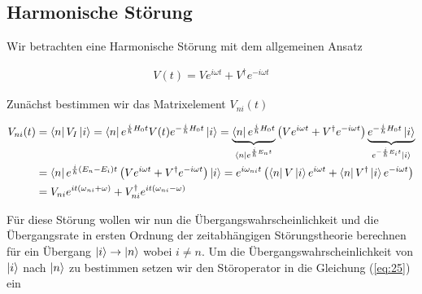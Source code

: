 \subsection{Harmonische Störung}

Wir betrachten eine Harmonische Störung mit dem allgemeinen Ansatz

\begin{align}
  \label{eq:41}
  V(t) = Ve^{i\omega t} + V^\dagger e^{-i\omega t}
\end{align}

Zunächst bestimmen wir das Matrixelement \(V_{ni}(t)\)

\begin{align}
  \label{eq:43}
   V_{ni}(t) &= \bra{n} V_I \ket{i} = \bra{n}e^{\frac{i}{\hbar}H_0 t}V(t) e^{ -\frac{i}{\hbar}H_0 t } \ket{i} = \underbr{\bra{n}e^{\frac{i}{\hbar}H_0 t}}_{\bra{n}e^{\frac{i}{\hbar}E_n t}} \left(Ve^{i\omega t} + V^\dagger e^{-i\omega t}\right) \underbr{ e^{ -\frac{i}{\hbar}H_0 t } \ket{i}}_{e^{ -\frac{i}{\hbar}E_i t } \ket{i}} \notag \\
 & = \bra{n}e^{\frac{i}{\hbar}(E_n-E_i) t} \left(Ve^{i\omega t} + V^\dagger e^{-i\omega t}\right) \ket{i} =  e^{i\omega_{ni} t} \left(\bra{n}V\ket{i} e^{i\omega t} +\bra{n} V^\dagger\ket{i} e^{-i\omega t}\right) \notag \\
 &=  V_{ni} e^{it(\omega_{ni}+\omega) }+ V^\dagger_{ni} e^{it(\omega_{ni}-\omega) }
\end{align}

Für diese Störung wollen wir nun die Übergangswahrscheinlichkeit und die Übergangsrate in ersten Ordnung der zeitabhängigen Störungstheorie berechnen für ein Übergang \(\left| i \right\rangle\to\left| n \right\rangle\) wobei \(i\ne n\). Um die Übergangswahrscheinlichkeit von \(\left| i \right\rangle\) nach \(\left| n \right\rangle\) zu bestimmen setzen wir den Störoperator in die Gleichung (\ref{eq:25}) ein

